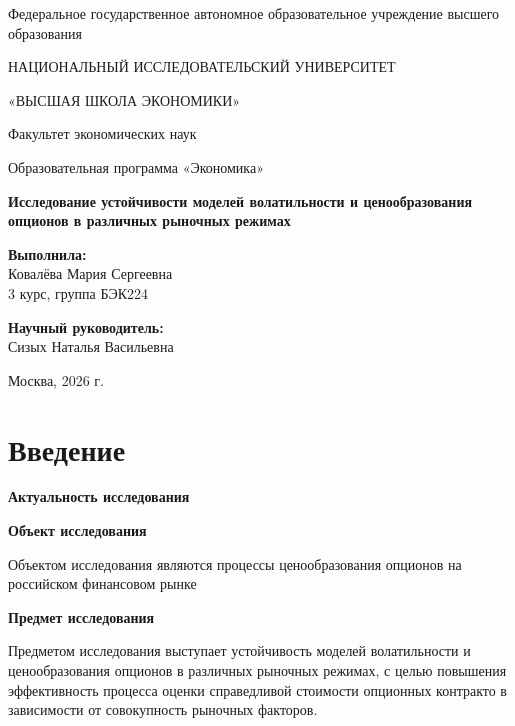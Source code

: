 \documentclass[11pt,a4paper]{article}
\begin{document}
\begin{titlepage}
\centering

{\large Федеральное государственное автономное образовательное учреждение высшего образования\par}
{\large НАЦИОНАЛЬНЫЙ ИССЛЕДОВАТЕЛЬСКИЙ УНИВЕРСИТЕТ\par}
{\large «ВЫСШАЯ ШКОЛА ЭКОНОМИКИ»\par}
{\large Факультет экономических наук\par}
{\large Образовательная программа «Экономика»\par}

\vfill

{\Large\bfseries
Исследование устойчивости моделей волатильности и ценообразования опционов в различных рыночных режимах
\par}

\vfill

\begin{flushright}
\textbf{Выполнила:}\\
Ковалёва Мария Сергеевна\\
3 курс, группа БЭК224
\end{flushright}

\vspace{1cm}

\begin{flushright}
\textbf{Научный руководитель:}\\
Сизых Наталья Васильевна\\[0.5cm]
\underline{\hspace{5cm}}
\end{flushright}

\vfill

{\large Москва, 2026 г.\par}
\end{titlepage}

\tableofcontents
\newpage

\section{Введение}

\textbf{Актуальность исследования}


\textbf{Объект исследования}

Объектом исследования являются процессы ценообразования опционов на российском финансовом рынке

\textbf{Предмет исследования}

Предметом исследования выступает устойчивость моделей волатильности и ценообразования опционов в различных рыночных режимах, с целью повышения эффективность процесса оценки справедливой стоимости опционных контракто в зависимости от совокупность рыночных факторов.
\end{document}
